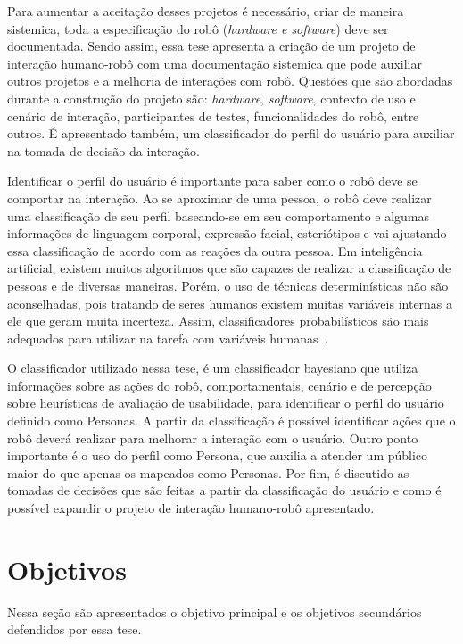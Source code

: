 Para aumentar a aceitação desses projetos é necessário, criar de maneira sistemica, toda a especificação do robô (\emph{hardware e software}) deve ser documentada. Sendo assim, essa tese apresenta a criação de um projeto de interação humano-robô com uma documentação sistemica que pode auxiliar outros projetos e a melhoria de interações com robô. Questões que são abordadas durante a construção do projeto são: \emph{hardware}, \emph{software}, contexto de uso e cenário de interação, participantes de testes, funcionalidades do robô, entre outros. É apresentado também, um classificador do perfil do usuário para auxiliar na tomada de decisão da interação.

Identificar o perfil do usuário é importante para saber como o robô deve se comportar na interação. Ao se aproximar de uma pessoa, o robô deve realizar uma classificação de seu perfil baseando-se em seu comportamento e algumas informações de linguagem corporal, expressão facial, esteriótipos e vai ajustando essa classificação de acordo com as reações da outra pessoa. Em inteligência artificial, existem muitos algoritmos que são capazes de realizar a classificação de pessoas e de diversas maneiras. Porém, o uso de técnicas determinísticas não são aconselhadas, pois tratando de seres humanos existem muitas variáveis internas a ele que geram muita incerteza. Assim, classificadores probabilísticos são mais adequados para utilizar na tarefa com variáveis humanas~\cite{faceli:2011, hartson:2012}.

O classificador utilizado nessa tese, é um classificador bayesiano que utiliza informações sobre as ações do robô, comportamentais, cenário e de percepção sobre heurísticas de avaliação de usabilidade, para identificar o perfil do usuário definido como Personas. A partir da classificação é possível identificar ações que o robô deverá realizar para melhorar a interação com o usuário. Outro ponto importante é o uso do perfil como Persona, que auxilia a atender um público maior do que apenas os mapeados como Personas. Por fim, é discutido as tomadas de decisões que são feitas a partir da classificação do usuário e como é possível expandir o projeto de interação humano-robô apresentado.

\section{Objetivos}
Nessa seção são apresentados o objetivo principal e os objetivos secundários defendidos por essa tese.

